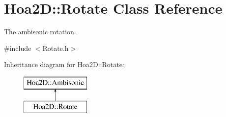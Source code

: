 \hypertarget{class_hoa2_d_1_1_rotate}{\section{Hoa2\-D\-:\-:Rotate Class Reference}
\label{class_hoa2_d_1_1_rotate}
}


The ambisonic rotation.  




{\ttfamily \#include $<$Rotate.\-h$>$}

Inheritance diagram for Hoa2\-D\-:\-:Rotate\-:\begin{figure}[H]
\begin{center}
\leavevmode
\includegraphics[height=2.000000cm]{class_hoa2_d_1_1_rotate}
\end{center}
\end{figure}
